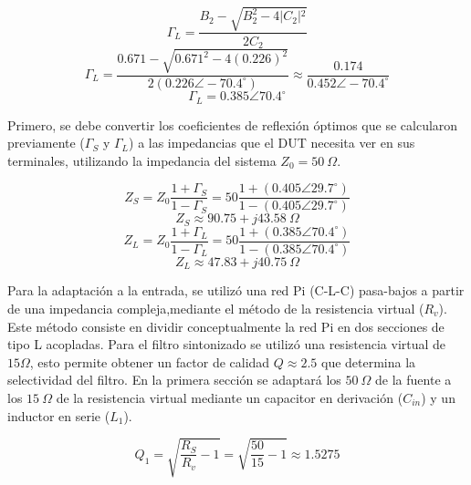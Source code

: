 \documentclass[11pt,a4paper,twoside]{report}
\begin{document}
	\begin{equation}
		\Gamma_L = \frac{B_2 - \sqrt{B_2^2 - 4\vert{}C_2\vert{}^2}}{2C_2}
	\end{equation}
	\begin{equation}
		\Gamma_L = \frac{0.671 - \sqrt{0.671^2 - 4(0.226)^2}}{2(0.226 \angle -70.4^\circ)} \approx \frac{0.174}{0.452 \angle -70.4^\circ}
	\end{equation}
	\begin{equation}
		\Gamma_L = 0.385 \angle 70.4^\circ
	\end{equation}
	
	Primero, se debe convertir los coeficientes de reflexión óptimos que se calcularon previamente ($\Gamma_S$ y $\Gamma_L$) a las impedancias que el DUT necesita ver en sus terminales, utilizando la impedancia del sistema $Z_0 = 50\ \Omega$.
	
	\begin{equation}
		Z_S = Z_0 \frac{1 + \Gamma_S}{1 - \Gamma_S} = 50 \frac{1 + (0.405 \angle 29.7^\circ)}{1 - (0.405 \angle 29.7^\circ)}
	\end{equation}
	\begin{equation}
		Z_S \approx 90.75 + j43.58\ \Omega
	\end{equation}
	\begin{equation}
		Z_L = Z_0 \frac{1 + \Gamma_L}{1 - \Gamma_L} = 50 \frac{1 + (0.385 \angle 70.4^\circ)}{1 - (0.385 \angle 70.4^\circ)}
	\end{equation}
	\begin{equation}
		Z_L \approx 47.83 + j40.75\ \Omega
	\end{equation}
	
	Para la adaptación a la entrada, se utilizó una red Pi (C-L-C) pasa-bajos a partir de una impedancia compleja,mediante el método de la resistencia virtual ($R_v$). Este método consiste en dividir conceptualmente la red Pi en dos secciones de tipo L acopladas. Para el filtro sintonizado se utilizó una resistencia virtual de $15 \Omega $, esto permite obtener un factor de calidad $ Q \approx 2.5$ que determina la selectividad del filtro. En la primera sección se adaptará los $50 \ \Omega$ de la fuente a los $15 \ \Omega$ de la resistencia virtual mediante un capacitor en derivación ($C_{in}$) y un inductor en serie ($L_1$).
	
	\begin{equation}
		Q_1 = \sqrt{\frac{R_S}{R_v} - 1} = \sqrt{\frac{50}{15} - 1} \approx 1.5275
	\end{equation}
	
\end{document}

